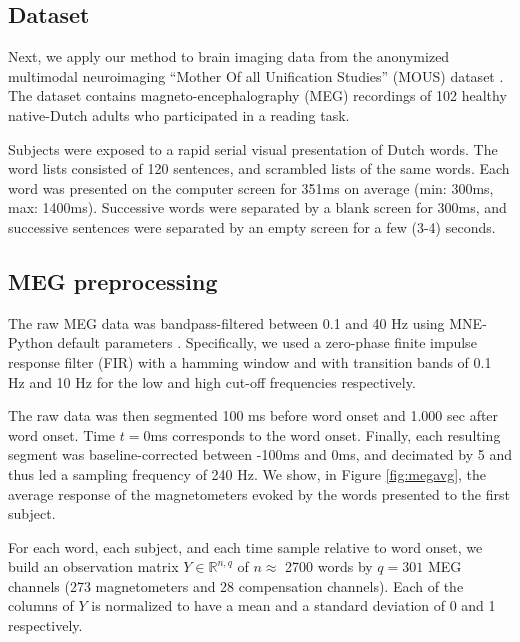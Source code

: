 \subsection{Dataset}

Next, we apply our method to brain imaging data from the anonymized multimodal
neuroimaging ``Mother Of all Unification Studies'' (MOUS) dataset \cite{schoffelen2019204}.
The dataset contains magneto-encephalography (MEG) recordings of 102 healthy native-Dutch
adults who participated in a reading task.

Subjects were exposed to a rapid serial visual presentation of Dutch words. The word lists
consisted of 120 sentences, and scrambled lists of the same words. Each word was presented on the computer screen for 351ms on average (min: 300ms, max: 1400ms).
Successive words were separated by a blank screen for 300ms, and successive
sentences were separated by an empty screen for a few (3-4) seconds.

\subsection{MEG preprocessing}

The raw MEG data was bandpass-filtered between 0.1 and 40 Hz using MNE-Python default
parameters \cite{mne}. Specifically, we used a zero-phase finite impulse response filter (FIR) with a hamming window and with transition bands of 0.1 Hz and 10 Hz for the low and high
cut-off frequencies respectively.

The raw data was then segmented 100 ms before word onset and 1.000 sec after
word onset. Time $t=0$ms corresponds to the word onset. Finally, each resulting segment was baseline-corrected between -100ms and 0ms, and decimated by 5 and thus led a sampling frequency of 240 Hz. We show, in Figure \ref{fig:megavg}, the average response of the
magnetometers evoked by the words presented to the first subject.

For each word, each subject, and each time sample relative to word onset, we build an observation matrix $Y \in \mathbb{R}^{n, q}$ of $n\approx$ 2700 words by $q=301$ MEG channels (273 magnetometers and 28 compensation channels). Each of the columns of $Y$ is normalized to have a mean and a standard deviation of 0 and 1 respectively.

